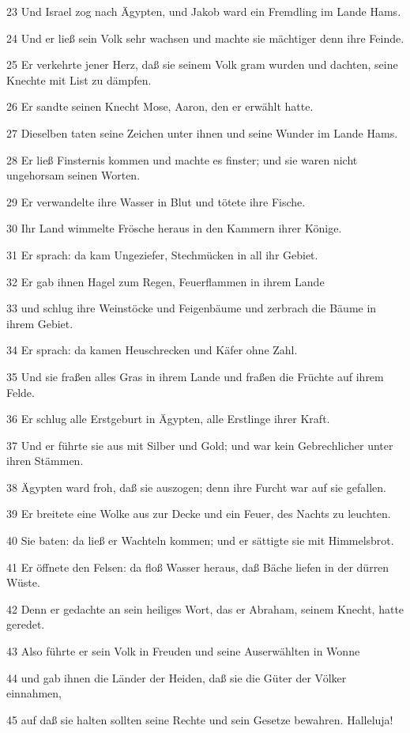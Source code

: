 \par 23 Und Israel zog nach Ägypten, und Jakob ward ein Fremdling im Lande Hams.
\par 24 Und er ließ sein Volk sehr wachsen und machte sie mächtiger denn ihre Feinde.
\par 25 Er verkehrte jener Herz, daß sie seinem Volk gram wurden und dachten, seine Knechte mit List zu dämpfen.
\par 26 Er sandte seinen Knecht Mose, Aaron, den er erwählt hatte.
\par 27 Dieselben taten seine Zeichen unter ihnen und seine Wunder im Lande Hams.
\par 28 Er ließ Finsternis kommen und machte es finster; und sie waren nicht ungehorsam seinen Worten.
\par 29 Er verwandelte ihre Wasser in Blut und tötete ihre Fische.
\par 30 Ihr Land wimmelte Frösche heraus in den Kammern ihrer Könige.
\par 31 Er sprach: da kam Ungeziefer, Stechmücken in all ihr Gebiet.
\par 32 Er gab ihnen Hagel zum Regen, Feuerflammen in ihrem Lande
\par 33 und schlug ihre Weinstöcke und Feigenbäume und zerbrach die Bäume in ihrem Gebiet.
\par 34 Er sprach: da kamen Heuschrecken und Käfer ohne Zahl.
\par 35 Und sie fraßen alles Gras in ihrem Lande und fraßen die Früchte auf ihrem Felde.
\par 36 Er schlug alle Erstgeburt in Ägypten, alle Erstlinge ihrer Kraft.
\par 37 Und er führte sie aus mit Silber und Gold; und war kein Gebrechlicher unter ihren Stämmen.
\par 38 Ägypten ward froh, daß sie auszogen; denn ihre Furcht war auf sie gefallen.
\par 39 Er breitete eine Wolke aus zur Decke und ein Feuer, des Nachts zu leuchten.
\par 40 Sie baten: da ließ er Wachteln kommen; und er sättigte sie mit Himmelsbrot.
\par 41 Er öffnete den Felsen: da floß Wasser heraus, daß Bäche liefen in der dürren Wüste.
\par 42 Denn er gedachte an sein heiliges Wort, das er Abraham, seinem Knecht, hatte geredet.
\par 43 Also führte er sein Volk in Freuden und seine Auserwählten in Wonne
\par 44 und gab ihnen die Länder der Heiden, daß sie die Güter der Völker einnahmen,
\par 45 auf daß sie halten sollten seine Rechte und sein Gesetze bewahren. Halleluja!

